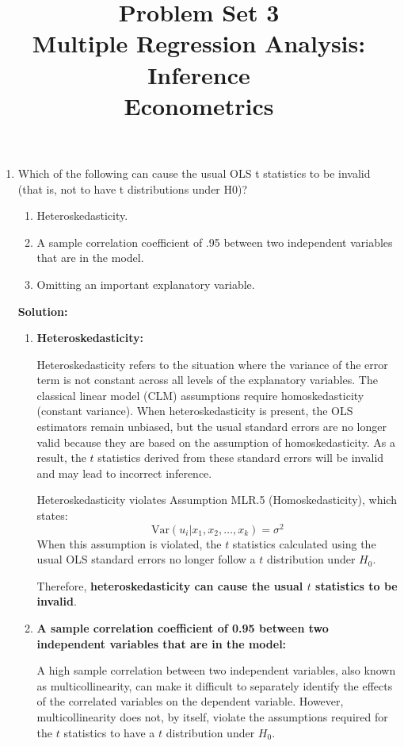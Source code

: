 \documentclass[12pt]{article}
\author{\empty}
\title{Problem Set 3\\Multiple Regression Analysis: Inference\\Econometrics}
\date{\empty}
\begin{document}
	\maketitle
	
\begin{enumerate}
	
\item Which of the following can cause the usual OLS t statistics to be invalid (that is, not to have t distributions
under H0)?
\begin{enumerate}
\item Heteroskedasticity.
\item A sample correlation coefficient of .95 between two independent variables that are in the model.
\item Omitting an important explanatory variable.
\end{enumerate}

{\color{blue}
\noindent \textbf{Solution:}
\begin{enumerate}

\item \textbf{Heteroskedasticity:}

Heteroskedasticity refers to the situation where the variance of the error term is not constant across all levels of the explanatory variables. The classical linear model (CLM) assumptions require homoskedasticity (constant variance). When heteroskedasticity is present, the OLS estimators remain unbiased, but the usual standard errors are no longer valid because they are based on the assumption of homoskedasticity. As a result, the $t$ statistics derived from these standard errors will be invalid and may lead to incorrect inference. 

Heteroskedasticity violates Assumption MLR.5 (Homoskedasticity), which states:
\[
\text{Var}(u_i | x_1, x_2, \dots, x_k) = \sigma^2
\]
When this assumption is violated, the $t$ statistics calculated using the usual OLS standard errors no longer follow a $t$ distribution under $H_0$.

Therefore, \textbf{heteroskedasticity can cause the usual $t$ statistics to be invalid}.

\item \textbf{A sample correlation coefficient of 0.95 between two independent variables that are in the model:}

A high sample correlation between two independent variables, also known as multicollinearity, can make it difficult to separately identify the effects of the correlated variables on the dependent variable. However, multicollinearity does not, by itself, violate the assumptions required for the $t$ statistics to have a $t$ distribution under $H_0$.


\end{enumerate}}
\end{enumerate}
\end{document}
